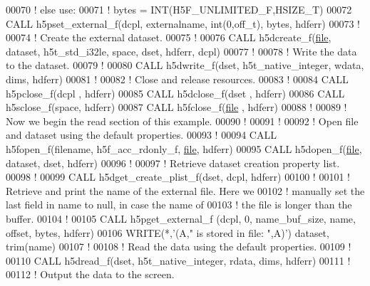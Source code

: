 \begin{DoxyCode}
00070   \textcolor{comment}{! else use:}
00071   \textcolor{comment}{!   bytes = INT(H5F\_UNLIMITED\_F,HSIZE\_T)}
00072   \textcolor{keyword}{CALL }h5pset\_external\_f(dcpl, externalname, int(0,off\_t), bytes, hdferr)
00073   \textcolor{comment}{!}
00074   \textcolor{comment}{! Create the external dataset.}
00075   \textcolor{comment}{!}
00076   \textcolor{keyword}{CALL }h5dcreate\_f(\hyperlink{structfile}{file}, dataset, h5t\_std\_i32le, space, dset, hdferr, dcpl)
00077   \textcolor{comment}{!}
00078   \textcolor{comment}{! Write the data to the dataset.}
00079   \textcolor{comment}{! }
00080   \textcolor{keyword}{CALL }h5dwrite\_f(dset, h5t\_native\_integer, wdata, dims, hdferr)
00081   \textcolor{comment}{!}
00082   \textcolor{comment}{! Close and release resources.}
00083   \textcolor{comment}{! }
00084   \textcolor{keyword}{CALL }h5pclose\_f(dcpl , hdferr)
00085   \textcolor{keyword}{CALL }h5dclose\_f(dset , hdferr)
00086   \textcolor{keyword}{CALL }h5sclose\_f(space, hdferr)
00087   \textcolor{keyword}{CALL }h5fclose\_f(\hyperlink{structfile}{file} , hdferr)
00088   \textcolor{comment}{!}
00089   \textcolor{comment}{! Now we begin the read section of this example.}
00090   \textcolor{comment}{!}
00091   \textcolor{comment}{!}
00092   \textcolor{comment}{! Open file and dataset using the default properties.}
00093   \textcolor{comment}{!}
00094   \textcolor{keyword}{CALL }h5fopen\_f(filename, h5f\_acc\_rdonly\_f, \hyperlink{structfile}{file}, hdferr)
00095   \textcolor{keyword}{CALL }h5dopen\_f(\hyperlink{structfile}{file}, dataset, dset, hdferr)
00096   \textcolor{comment}{!}
00097   \textcolor{comment}{! Retrieve dataset creation property list.}
00098   \textcolor{comment}{!}
00099   \textcolor{keyword}{CALL }h5dget\_create\_plist\_f(dset, dcpl, hdferr)
00100   \textcolor{comment}{!}
00101   \textcolor{comment}{! Retrieve and print the name of the external file.  Here we}
00102   \textcolor{comment}{! manually set the last field in name to null, in case the name of}
00103   \textcolor{comment}{! the file is longer than the buffer.}
00104   \textcolor{comment}{!}
00105   \textcolor{keyword}{CALL }h5pget\_external\_f (dcpl, 0, name\_buf\_size, name, offset, bytes, hdferr)
00106   \textcolor{keyword}{WRITE}(*,\textcolor{stringliteral}{'(A," is stored in file: ",A)'})  dataset, trim(name)
00107   \textcolor{comment}{!}
00108   \textcolor{comment}{! Read the data using the default properties.}
00109   \textcolor{comment}{!}
00110   \textcolor{keyword}{CALL }h5dread\_f(dset, h5t\_native\_integer, rdata, dims, hdferr)
00111   \textcolor{comment}{!}
00112   \textcolor{comment}{! Output the data to the screen.}

\end{DoxyCode}
